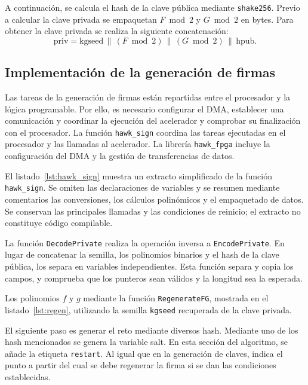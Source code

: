 A continuación, se calcula el hash de la clave pública mediante \texttt{shake256}.
Previo a calcular la clave privada se empaquetan $F \bmod 2$ y $G \bmod 2$ en bytes.
Para obtener la clave privada se realiza la siguiente concatenación:
\[
\mathrm{priv} = \mathrm{kgseed} \,\|\, (F \bmod 2)
\,\|\, (G \bmod 2) \,\|\, \mathrm{hpub}.
\]

\subsection{Implementación de la generación de firmas}

Las tareas de la generación de firmas están repartidas entre
el procesador y la lógica programable. Por ello, es necesario
configurar el DMA, establecer una comunicación y coordinar
la ejecución del acelerador y comprobar su finalización con el procesador.
La función \texttt{hawk\_sign} coordina las tareas ejecutadas en el procesador 
y las llamadas al acelerador. La librería \texttt{hawk\_fpga}
incluye la configuración del DMA y la gestión de transferencias de datos.

El listado~\ref{lst:hawk_sign} muestra un extracto simplificado de la función
\texttt{hawk\_sign}. Se omiten las declaraciones de variables y se resumen
mediante comentarios las conversiones, los cálculos polinómicos y el
empaquetado de datos. Se conservan las principales llamadas y las
condiciones de reinicio; el extracto no constituye código compilable.



La función \texttt{DecodePrivate} realiza la operación inversa a
\texttt{EncodePrivate}. En lugar de concatenar la semilla, los polinomios
binarios y el hash de la clave pública, los separa en variables independientes.
Esta función separa y copia los campos, y comprueba que los punteros sean
válidos y la longitud sea la esperada.

Los polinomios $f$ y $g$ mediante la función
\texttt{RegenerateFG}, mostrada en el listado~\ref{lst:regen},
utilizando la semilla \texttt{kgseed} recuperada de la clave privada.

El siguiente paso es generar el reto mediante diversos hash. Mediante uno
de los hash mencionados se genera la variable salt. En esta sección del algoritmo,
se añade la etiqueta \texttt{restart}. Al igual que en la generación de claves,
indica el punto a partir del cual se debe regenerar la firma si se dan las condiciones
establecidas.

